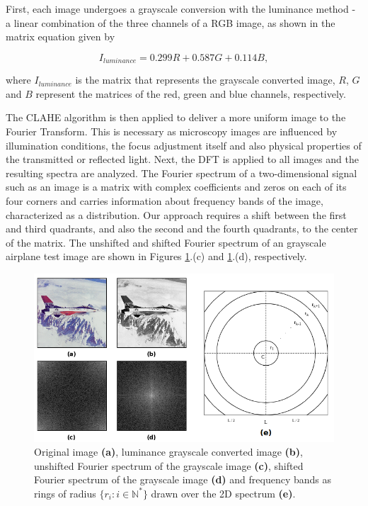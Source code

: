 First, each image undergoes a grayscale conversion with the luminance method \cite{ponti2016image} - a 
linear combination of the three channels of a RGB image, as shown in the matrix equation given by

\begin{equation}
    \label{eqn:luminance}
    I_{luminance} = 0.299R + 0.587G + 0.114B,
\end{equation}

\noindent where $I_{luminance}$ is the matrix that represents the grayscale converted image, $R$, $G$ and $B$ represent the matrices of the red, green and blue channels, respectively. 

The CLAHE algorithm is then applied to deliver a more uniform image to the Fourier Transform. This is necessary as microscopy images are influenced by illumination conditions, the focus adjustment itself and also physical properties of the transmitted or reflected light. Next, the DFT is applied to all images and the resulting spectra are analyzed. The Fourier spectrum of a two-dimensional signal such as an image is a matrix with complex coefficients and zeros on each of its four corners and carries information about frequency bands of the image, characterized as a distribution. Our approach requires a shift between the first and third quadrants, and also the second and the fourth quadrants, to the center of the matrix. The unshifted and shifted Fourier spectrum of an grayscale airplane test image are shown in Figures \ref{fig:fourier_spectrum}.(c) and \ref{fig:fourier_spectrum}.(d), respectively. 

\begin{figure}[ht]
	\centering
	\caption{Original image \textbf{(a)}, luminance grayscale converted image \textbf{(b)}, unshifted Fourier spectrum of the grayscale image \textbf{(c)}, shifted Fourier spectrum of the grayscale image \textbf{(d)} and frequency bands as rings of radius $\{r_{i}: i\in\mathbb{N}^{*}\}$ drawn over the 2D spectrum \textbf{(e)}.}
	\label{fig:fourier_spectrum}
	\includegraphics[scale=0.6]{images/fourier_spectrum.png}
	\centering
	\fautor
\end{figure}

